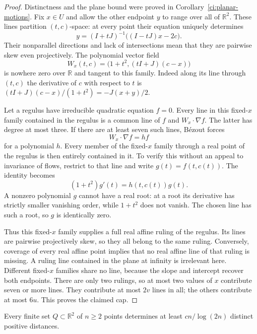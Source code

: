 \begin{proof}
Distinctness and the plane bound were proved in
Corollary~\ref{ci:planar-motions}.  Fix $x\in U$ and allow the
other endpoint $y$ to range over all of $\mathbb R^2$.  These lines
partition $(t,c)$-space: at every point their equation uniquely
determines
\[
 y=(I+tJ)^{-1}\bigl((I-tJ)x-2c\bigr).
\]
Their nonparallel directions and lack of intersections mean that
they are pairwise skew even projectively.  The polynomial vector
field
\[
 W_x(t,c)=\bigl(1+t^2,(tI+J)(c-x)\bigr)
\]
is nowhere zero over $\mathbb R$ and tangent to this family.
Indeed along its line through $(t,c)$ the derivative of $c$ with
respect to $t$ is $(tI+J)(c-x)/(1+t^2)=-J(x+y)/2$.

Let a regulus have irreducible quadratic equation $f=0$.  Every
line in this fixed-$x$ family contained in the regulus is a common
line of $f$ and $W_x\cdot\nabla f$.  The latter has degree at
most three.  If there are at least seven such lines, B\'ezout
forces
\[
 W_x\cdot\nabla f=h f
\]
for a polynomial $h$.  Every member of the fixed-$x$ family
through a real point of the regulus is then entirely contained
in it.  To verify this without an appeal to invariance of flows,
restrict to that line and write $g(t)=f(t,c(t))$.  The identity
becomes
\[
 (1+t^2)g'(t)=h(t,c(t))g(t).
\]
A nonzero polynomial $g$ cannot have a real root: at a root its
derivative has strictly smaller vanishing order, while $1+t^2$
does not vanish.  The chosen line has such a root, so $g$ is
identically zero.

Thus this fixed-$x$ family supplies a full real affine ruling of the
regulus.  Its lines are pairwise projectively skew, so they all
belong to the same ruling.  Conversely, coverage of every real
affine point implies that no real affine line of that ruling is
missing.  A ruling line contained in the plane at infinity is
irrelevant here.
Different fixed-$x$ families share no line, because the slope
and intercept recover both endpoints.  There are only two
rulings, so at most two values of $x$ contribute seven or more
lines.  They contribute at most $2v$ lines in all; the others
contribute at most $6u$.  This proves the claimed cap.
\end{proof}

\begin{theorem}\label{ci:planar-distances}
Every finite set $Q\subset\mathbb R^2$ of $n\ge2$ points determines
at least $c n/\log(2n)$ distinct positive distances.
\end{theorem}

